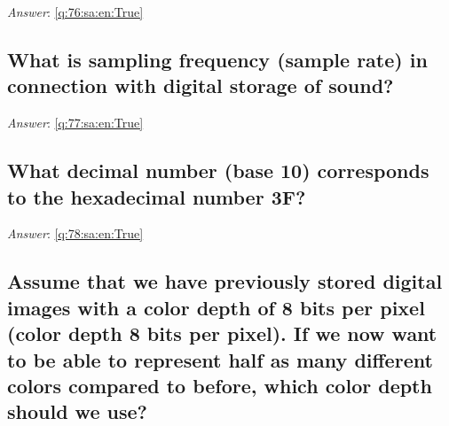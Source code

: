 \documentclass[a4paper,11pt,oneside]{article}
\begin{document}
\begin{sloppypar}
\label{q:76:sa:en:False}

\vspace{2cm}

\noindent\makebox[\textwidth]{\hrulefill}

\vspace{1cm}

\textit{Answer}: \autoref{q:76:sa:en:True}



\subsection{What is sampling frequency (sample rate) in connection with digital storage of sound?}

\label{q:77:sa:en:False}

\vspace{2cm}

\noindent\makebox[\textwidth]{\hrulefill}

\vspace{1cm}

\textit{Answer}: \autoref{q:77:sa:en:True}



\subsection{What decimal number (base 10) corresponds to the hexadecimal number 3F?}

\label{q:78:sa:en:False}

\vspace{2cm}

\noindent\makebox[\textwidth]{\hrulefill}

\vspace{1cm}

\textit{Answer}: \autoref{q:78:sa:en:True}



\subsection{Assume that we have previously stored digital images with a color depth of 8 bits per pixel (color depth 8 bits per pixel). If we now want to be able to represent half as many different colors compared to before, which color depth should we use?}

\label{q:79:sa:en:False}

\vspace{2cm}

\noindent\makebox[\textwidth]{\hrulefill}


\end{sloppypar}
\end{document}
